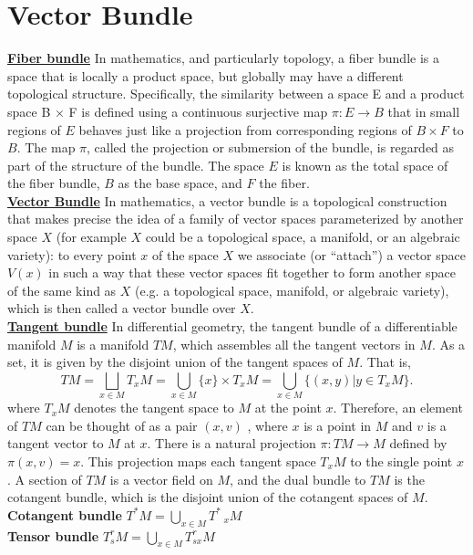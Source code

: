\section{Vector Bundle}
\begin{newdef}
\href{https://en.wikipedia.org/wiki/Fiber_bundle}{\textbf{Fiber bundle}} In mathematics, and particularly topology, a fiber bundle is a space that is locally a product space, but globally may have a different topological structure. Specifically, the similarity between a space E and a product space B × F is defined using a continuous surjective map $\pi :E \to B$ that in small regions of $E$ behaves just like a projection from corresponding regions of $B \times F$ to $B$. The map $\pi$, called the projection or submersion of the bundle, is regarded as part of the structure of the bundle. The space $E$ is known as the total space of the fiber bundle, $B$ as the base space, and $F$ the fiber.\\
\href{https://en.wikipedia.org/wiki/Vector_bundle}{\textbf{Vector Bundle}} 
In mathematics, a vector bundle is a topological construction that makes precise the idea of a family of vector spaces parameterized by another space $X$ (for example $X$ could be a topological space, a manifold, or an algebraic variety): to every point $x$ of the space $X$ we associate (or ``attach'') a vector space $V(x)$ in such a way that these vector spaces fit together to form another space of the same kind as $X$ (e.g. a topological space, manifold, or algebraic variety), which is then called a vector bundle over $X$.\\
\href{https://en.wikipedia.org/wiki/Tangent_bundle}{\textbf{Tangent bundle}} 
In differential geometry, the tangent bundle of a differentiable manifold $M$ is a manifold $TM$, which assembles all the tangent vectors in $M$. As a set, it is given by the disjoint union of the tangent spaces of $M$. That is,
\[
TM = \bigsqcup_{x \in M}T_xM = \bigcup_{x \in M} \{x\} \times T_xM = \bigcup_{x \in M}\{(x,y)| y \in T_xM \}
.\]
where $T_xM$ denotes the tangent space to $M$ at the point $x$. Therefore, an element of $TM$ can be thought of as a pair $(x,v)$ , where $x$ is a point in $M$ and $v$ is a tangent vector to $M$ at $x$. There is a natural projection $\pi : TM \to M$ defined by $\pi(x,v) = x$. This projection maps each tangent space $T_xM$ to the single point $x$. A section of $TM$ is a vector field on $M$, and the dual bundle to $TM$ is the cotangent bundle, which is the disjoint union of the cotangent spaces of $M$.\\
\textbf{Cotangent bundle} $T^*M = \bigcup_{x \in M} T^*_{\phantom{*}x}M$\\
\textbf{Tensor bundle} $T^r_sM = \bigcup_{x \in M} T^{r\phantom{x}}_{sx}M$\\
\end{newdef}


